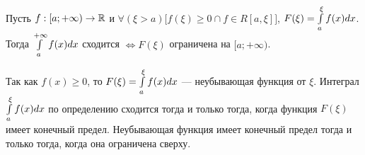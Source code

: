 \begin{teorema}
Пусть $f:[a;+\infty)\to\mathbb{R}$ и ${\forall(\xi>a)\bigl[f(\xi)\geq 0 \cap f\in R[a,\xi]\bigr]}$, $F(\xi)=\int\limits_a^\xi f(x) dx$.
Тогда $\int\limits_a^{+\infty} f(x) dx$ сходится $\Leftrightarrow F(\xi)$ ограничена на $[a;+\infty)$.
\end{teorema}
\dokvo
Так как $f(x)\geq 0$, то $F(\xi)=\int\limits_a^\xi f(x) dx$ --- неубывающая функция от $\xi$.
Интеграл $\int\limits_a^\xi f(x) dx$ по определению сходится тогда и только тогда, когда функция $F(\xi)$ имеет конечный предел.
Неубывающая функция имеет конечный предел тогда и только тогда, когда она ограничена сверху.
\dokno
